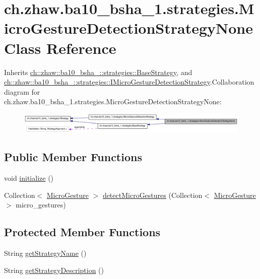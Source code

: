 \hypertarget{classch_1_1zhaw_1_1ba10__bsha__1_1_1strategies_1_1MicroGestureDetectionStrategyNone}{
\section{ch.zhaw.ba10\_\-bsha\_\-1.strategies.MicroGestureDetectionStrategyNone Class Reference}
\label{classch_1_1zhaw_1_1ba10__bsha__1_1_1strategies_1_1MicroGestureDetectionStrategyNone}
}


Inherits \hyperlink{classch_1_1zhaw_1_1ba10__bsha__1_1_1strategies_1_1BaseStrategy}{ch::zhaw::ba10\_\-bsha\_::strategies::BaseStrategy}, and \hyperlink{interfacech_1_1zhaw_1_1ba10__bsha__1_1_1strategies_1_1IMicroGestureDetectionStrategy}{ch::zhaw::ba10\_\-bsha\_::strategies::IMicroGestureDetectionStrategy}.Collaboration diagram for ch.zhaw.ba10\_\-bsha\_\-1.strategies.MicroGestureDetectionStrategyNone:\nopagebreak
\begin{figure}[H]
\begin{center}
\leavevmode
\includegraphics[width=400pt]{classch_1_1zhaw_1_1ba10__bsha__1_1_1strategies_1_1MicroGestureDetectionStrategyNone__coll__graph}
\end{center}
\end{figure}
\subsection*{Public Member Functions}
\begin{DoxyCompactItemize}
\item 
void \hyperlink{classch_1_1zhaw_1_1ba10__bsha__1_1_1strategies_1_1MicroGestureDetectionStrategyNone_ab6f6f8d519b2fe7a8e3b3279145d5431}{initialize} ()
\item 
Collection$<$ \hyperlink{classch_1_1zhaw_1_1ba10__bsha__1_1_1service_1_1MicroGesture}{MicroGesture} $>$ \hyperlink{classch_1_1zhaw_1_1ba10__bsha__1_1_1strategies_1_1MicroGestureDetectionStrategyNone_affb5fbb496f04e53720496e1cc3feb88}{detectMicroGestures} (Collection$<$ \hyperlink{classch_1_1zhaw_1_1ba10__bsha__1_1_1service_1_1MicroGesture}{MicroGesture} $>$ micro\_\-gestures)
\end{DoxyCompactItemize}
\subsection*{Protected Member Functions}
\begin{DoxyCompactItemize}
\item 
String \hyperlink{classch_1_1zhaw_1_1ba10__bsha__1_1_1strategies_1_1MicroGestureDetectionStrategyNone_a2e46564a49ac92530fc648e3149d5ee4}{getStrategyName} ()
\item 
String \hyperlink{classch_1_1zhaw_1_1ba10__bsha__1_1_1strategies_1_1MicroGestureDetectionStrategyNone_ad6f173fc0670d819bfa82551fc9775f5}{getStrategyDescription} ()
\end{DoxyCompactItemize}


